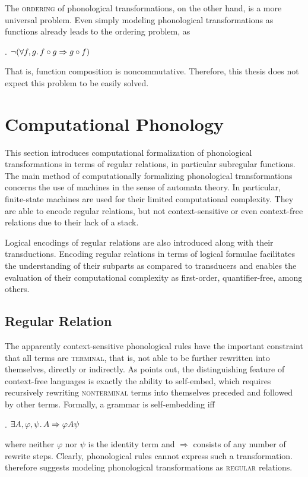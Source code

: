 \documentclass[12pt, a4paper]{report}
\newcommand{\textterm}[1]{\textsc{#1}\index{#1}}
\renewcommand{\implies}{\Rightarrow}
\begin{document}
The \textterm{ordering} of phonological transformations, on the other
hand, is a more universal problem.  Even simply modeling phonological
transformations as functions already leads to the ordering problem, as

\ex. \(\neg(\forall f, g\ldotp f \circ g \implies g \circ f)\)

That is, function composition is noncommutative.  Therefore, this
thesis does not expect this problem to be easily solved.

\section{Computational Phonology}
This section introduces computational formalization of phonological
transformations in terms of regular relations, in particular
subregular functions.  The main method of computationally formalizing
phonological transformations concerns the use of machines in the sense
of automata theory.  In particular, finite-state machines are used for
their limited computational complexity.  They are able to encode
regular relations, but not context-sensitive or even context-free
relations due to their lack of a stack.

Logical encodings of regular relations are also introduced along with
their transductions.  Encoding regular relations in terms of logical
formulae facilitates the understanding of their subparts as compared
to transducers and enables the evaluation of their computational
complexity as first-order, quantifier-free, among others.

\subsection{Regular Relation}
The apparently context-sensitive phonological rules have the important
constraint that all terms are \textterm{terminal}, that is, not able
to be further rewritten into themselves, directly or indirectly.  As
\textcite{c59cfpg} points out, the distinguishing feature of
context-free languages is exactly the ability to self-embed, which
requires recursively rewriting \textterm{nonterminal} terms into
themselves preceded and followed by other terms.  Formally, a grammar
is self-embedding iff

\ex. \(\exists A, \varphi, \psi\ldotp A \Rightarrow \varphi A \psi\)

where neither \(\varphi\) nor \(\psi\) is the identity term and
\(\Rightarrow\) consists of any number of rewrite steps.  Clearly,
phonological rules cannot express such a transformation.
\textcite{kk94rmprs} therefore suggests modeling phonological
transformations as \textterm{regular} relations.
\end{document}
